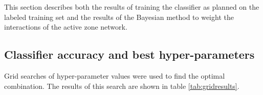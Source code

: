 This section describes both the results of training the classifier as planned on the labeled training set and the results of the Bayesian method to weight the interactions of the active zone network.

\subsection{Classifier accuracy and best hyper-parameters}
\label{gridresults}

Grid searches of hyper-parameter values were used to find the optimal combination.
The results of this search are shown in table \ref{tab:gridresults}.

